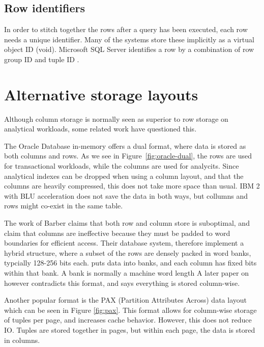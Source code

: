 \subsection{Row identifiers}
\label{sub:Row identifiers}
In order to stitch together the rows after a query has been executed, each row needs a unique identifier. Many of the systems store these implicitly \cite{Boncz2002-yj, Raman2013-em, Stonebraker2005-qz, Lamb2012-kg} as a virtual object ID (void). Microsoft SQL Server identifies a row by a combination of row group ID and tuple ID \cite{Larson2013-mc}.


\section{Alternative storage layouts}
\label{sec:Alternative storage layouts}
Although column storage is normally seen as superior to row storage on analytical workloads, some related work have questioned this.

The Oracle Database in-memory \cite{Lahiri2015-mz} offers a dual format, where data is stored as both columns and rows. As we see in Figure~\ref{fig:oracle-dual}, the rows are used for transactional workloads, while the columns are used for analycits. Since analytical indexes can be dropped when using a column layout, and that the columns are heavily compressed, this does not take more space than usual. IBM 2 with BLU acceleration \cite{Raman2013-em} does not save the data in both ways, but collumns and rows might co-exist in the same table.

The work of Barber \ea \cite{Barber2012-xt} claims that both row and column store is suboptimal, and claim that columns are ineffective because they must be padded to word boundaries for efficient access. Their database system,  therefore implement a hybrid structure, where a subset of the rows are densely packed in word banks, typcially 128-256 bits each.  puts data into banks, and each column has fixed bits within that bank. A bank is normally a machine word length \cite{Johnson2008-cp} A later paper on  \cite{Raman2013-em} however contradicts this format, and says everything is stored column-wise.

Another popular format is the PAX (Partition Attributes Across) data layout \cite{Holloway2008-rr, Bjorklund2011-wh} which can be seen in Figure \ref{fig:pax}. This format allows for column-wise storage of tuples per page, and increases cache behavior. However, this does not reduce IO. Tuples are stored together in pages, but within each page, the data is stored in columns.

